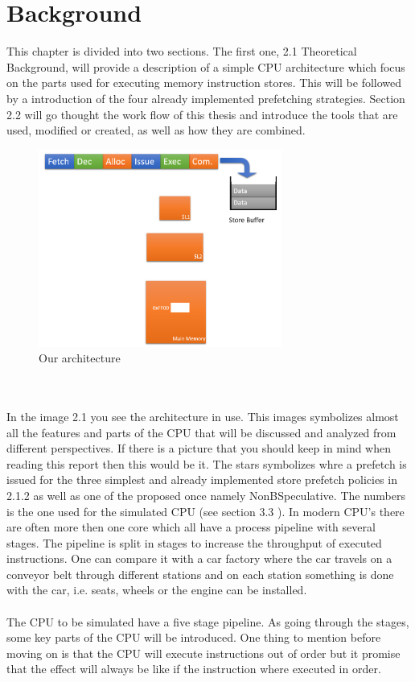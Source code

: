 \chapter{Background}
\label{chap:bg}
This chapter is divided into two sections. The first one, 2.1 \fixme Theoretical Background,
will provide a description of a simple CPU architecture which focus on the parts used
for executing memory instruction stores. This will be followed by a introduction of
the four already implemented prefetching strategies. Section 2.2 \fixme will go thought the
work flow of this thesis and introduce the tools that are used, modified or created, as
well as how they are combined.

\fixme
\begin{figure}[h]
\centering
\includegraphics[width=8cm]{figure/thoeratical-arc.PNG}
\caption{Our architecture}
\label{img:arc}
\end{figure}
\\ \\
In the image 2.1 \fixme you see the architecture in use. This images symbolizes almost all
the features and parts of the CPU that will be discussed and analyzed from different
perspectives. If there is a picture that you should keep in mind when reading this
report then this would be it. The stars symbolizes whre a prefetch is issued for the
three simplest and already implemented store prefetch policies in 2.1.2 \fixme as well as one
of the proposed once namely NonBSpeculative. The numbers is the one used for the
simulated CPU (see section 3.3 \fixme). In modern CPU’s there are often more then one
core which all have a process pipeline with several stages. The pipeline is split in
stages to increase the throughput of executed instructions. One can compare it with
a car factory where the car travels on a conveyor belt through different stations and
on each station something is done with the car, i.e. seats, wheels or the engine can
be installed.
\\ \\
The CPU to be simulated have a five stage pipeline. As going through the stages,
some key parts of the CPU will be introduced. One thing to mention before moving
on is that the CPU will execute instructions out of order but it promise that the effect
will always be like if the instruction where executed in order.
 \\ \\

